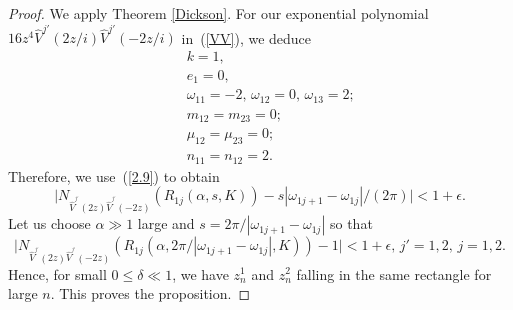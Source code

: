 \documentclass[10pt,a4paper]{amsart}
\begin{document}
\begin{proof}
We apply Theorem \ref{Dickson}. For our exponential polynomial 
$16z^{4}\hat{V}^{j'}(2z/i)\hat{V}^{j'}(-2z/i)$ in~(\ref{VV}), we deduce
\begin{eqnarray*}
&&k=1,\\
&&e_{1}=0,\\
&&\omega_{11}=-2,\,\omega_{12}=0,\,\omega_{13}=2;\\
&&m_{12}=m_{23}=0;\\
&&\mu_{12}=\mu_{23}=0;\\
&&n_{11}=n_{12}=2.
\end{eqnarray*}
Therefore, we use~(\ref{2.9}) to obtain
\begin{equation}\nonumber
\big|N_{\hat{V}^{^{j'}}(2z)\hat{V}^{^{j'}}(-2z)}(R_{1j}(\alpha,s,K))-s|\omega_{1j+1}-\omega_{1j}|/(2\pi)\big|<1+\epsilon.
\end{equation} 
Let us choose $\alpha\gg1$ large and $s=2\pi/|\omega_{1j+1}-\omega_{1j}|$ so that
\begin{equation}\label{2.11}
\big|N_{\hat{V}^{^{j'}}(2z)\hat{V}^{^{j'}}(-2z)}(R_{1j}(\alpha,2\pi/|\omega_{1j+1}-\omega_{1j}|,K))-1\big|<1+\epsilon,\,j'=1,2,\,j=1,2.
\end{equation} 
Hence, for small $0\leq\delta\ll1$, we have $z^{1}_{n}$ and $z^{2}_{n}$ falling in the same rectangle for large $n$.
This proves the proposition.
\end{proof}
\end{document}
